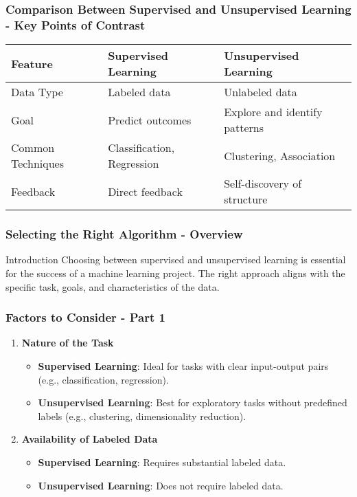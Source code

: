 \documentclass{beamer}
\begin{document}
\begin{frame}[fragile]
    \frametitle{Comparison Between Supervised and Unsupervised Learning - Key Points of Contrast}
    \begin{center}
        \begin{tabular}{|l|l|l|}
            \hline
            \textbf{Feature} & \textbf{Supervised Learning} & \textbf{Unsupervised Learning} \\
            \hline
            Data Type & Labeled data & Unlabeled data \\
            \hline
            Goal & Predict outcomes & Explore and identify patterns \\
            \hline
            Common Techniques & Classification, Regression & Clustering, Association \\
            \hline
            Feedback & Direct feedback & Self-discovery of structure \\
            \hline
        \end{tabular}
    \end{center}
\end{frame}

\begin{frame}[fragile]
    \frametitle{Selecting the Right Algorithm - Overview}
    \begin{block}{Introduction}
        Choosing between supervised and unsupervised learning is essential for the success of a machine learning project. The right approach aligns with the specific task, goals, and characteristics of the data.
    \end{block}
\end{frame}

\begin{frame}[fragile]
    \frametitle{Factors to Consider - Part 1}
    \begin{enumerate}
        \item \textbf{Nature of the Task}
        \begin{itemize}
            \item \textbf{Supervised Learning}: Ideal for tasks with clear input-output pairs (e.g., classification, regression).
            \item \textbf{Unsupervised Learning}: Best for exploratory tasks without predefined labels (e.g., clustering, dimensionality reduction).
        \end{itemize}
        
        \item \textbf{Availability of Labeled Data}
        \begin{itemize}
            \item \textbf{Supervised Learning}: Requires substantial labeled data.
            \item \textbf{Unsupervised Learning}: Does not require labeled data.
        \end{itemize}
    \end{enumerate}
\end{frame}
\end{document}
